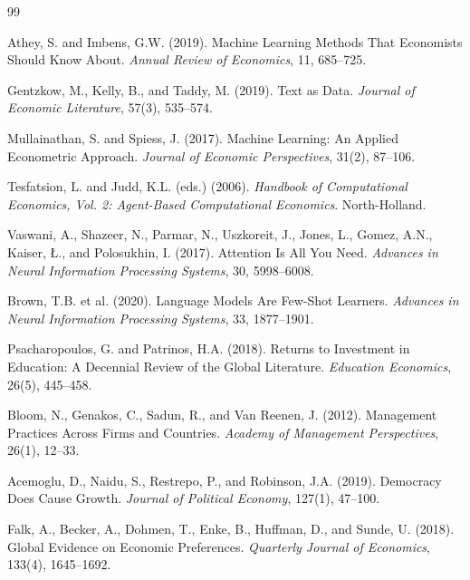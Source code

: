 \documentclass[12pt,a4paper]{article}
\begin{document}
\begin{thebibliography}{99}

Athey, S. and Imbens, G.W. (2019).
Machine Learning Methods That Economists Should Know About.
\emph{Annual Review of Economics}, 11, 685–725.

Gentzkow, M., Kelly, B., and Taddy, M. (2019).
Text as Data.
\emph{Journal of Economic Literature}, 57(3), 535–574.

Mullainathan, S. and Spiess, J. (2017).
Machine Learning: An Applied Econometric Approach.
\emph{Journal of Economic Perspectives}, 31(2), 87–106.

Tesfatsion, L. and Judd, K.L. (eds.) (2006).
\emph{Handbook of Computational Economics, Vol. 2: Agent-Based Computational Economics}.
North-Holland.

Vaswani, A., Shazeer, N., Parmar, N., Uszkoreit, J., Jones, L., Gomez, A.N., Kaiser, Ł., and Polosukhin, I. (2017).
Attention Is All You Need.
\emph{Advances in Neural Information Processing Systems}, 30, 5998–6008.

Brown, T.B. et al. (2020).
Language Models Are Few-Shot Learners.
\emph{Advances in Neural Information Processing Systems}, 33, 1877–1901.


Psacharopoulos, G. and Patrinos, H.A. (2018).
Returns to Investment in Education: A Decennial Review of the Global Literature.
\emph{Education Economics}, 26(5), 445--458.

Bloom, N., Genakos, C., Sadun, R., and Van Reenen, J. (2012).
Management Practices Across Firms and Countries.
\emph{Academy of Management Perspectives}, 26(1), 12--33.

Acemoglu, D., Naidu, S., Restrepo, P., and Robinson, J.A. (2019).
Democracy Does Cause Growth.
\emph{Journal of Political Economy}, 127(1), 47--100.

Falk, A., Becker, A., Dohmen, T., Enke, B., Huffman, D., and Sunde, U. (2018).
Global Evidence on Economic Preferences.
\emph{Quarterly Journal of Economics}, 133(4), 1645--1692.


\end{thebibliography}
\end{document}
